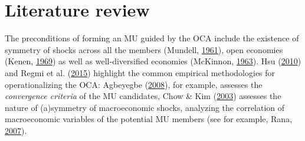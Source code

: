 \documentclass[]{article}
\begin{document}
\hypertarget{literature-review}{%
\section{Literature review}\label{literature-review}}

The preconditions of forming an MU guided by the OCA include the existence of symmetry of shocks across all the members (Mundell, \protect\hyperlink{ref-mundell1961theory}{1961}), open economies (Kenen, \protect\hyperlink{ref-kenen1969theory}{1969}) as well as well-diversified economies (McKinnon, \protect\hyperlink{ref-McKinnon1963}{1963}). Hsu (\protect\hyperlink{ref-hsu2010common}{2010}) and Regmi et al. (\protect\hyperlink{ref-Regmi2015}{2015}) highlight the common empirical methodologies for operationalizing the OCA: Agbeyegbe (\protect\hyperlink{ref-agbeyegbe2008feasibility}{2008}), for example, assesses the \emph{convergence criteria} of the MU candidates, Chow \& Kim (\protect\hyperlink{ref-Chow2003}{2003}) assesses the nature of (a)symmetry of macroeconomic shocks, analyzing the correlation of macroeconomic variables of the potential MU members (see for example, Rana, \protect\hyperlink{ref-RANA2007711}{2007}).
\end{document}
